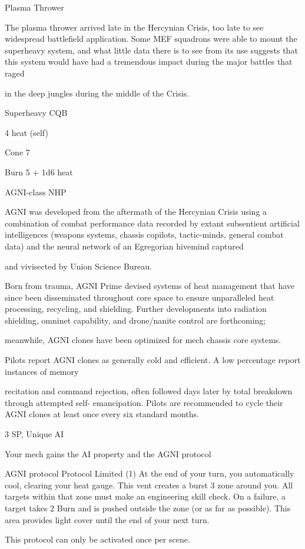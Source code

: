 Plasma Thrower  

The plasma thrower arrived late in the Hercynian Crisis, too late to see widespread battlefield application.  
Some MEF squadrons were able to mount the superheavy system, and what little data there is to see from  
its use suggests that this system would have had a tremendous impact during the major battles that raged  

in the deep jungles during the middle of the Crisis.   

Superheavy CQB
 
4 heat (self)
 
Cone 7
 
Burn 5 + 1d6 heat
 

AGNI-class NHP  

AGNI was developed from the aftermath of the Hercynian Crisis using a combination of combat  
performance data recorded by extant subsentient artificial intelligences (weapons systems, chassis  
copilots, tactic-minds, general combat data) and the neural network of an Egregorian hivemind captured  

and vivisected by Union Science Bureau.   

                                                                                                                       


Born from trauma, AGNI Prime devised systems of heat management that have since been disseminated  
throughout core space to ensure unparalleled heat processing, recycling, and shielding. Further  
developments into radiation shielding, omninet capability, and drone/nanite control are forthcoming;  

meanwhile, AGNI clones have been optimized for mech chassis core systems.  

Pilots report AGNI clones as generally cold and efficient. A low percentage report instances of memory  

recitation and command rejection, often followed days later by total breakdown through attempted self- 
emancipation. Pilots are recommended to cycle their AGNI clones at least once every six standard months.    

3 SP, Unique  
AI  

Your mech gains the AI property and the AGNI protocol
 
         AGNI protocol  
	        Protocol  
         Limited (1)  
         At the end of your turn, you automatically cool, clearing your heat gauge. This vent  
         creates a burst 3 zone around you. All targets within that zone must make an engineering  
         skill check. On a failure, a target takes 2 Burn and is pushed outside the zone (or as far as  
         possible). This area provides light cover until the end of your next turn.
 
         This protocol can only be activated once per scene.
 